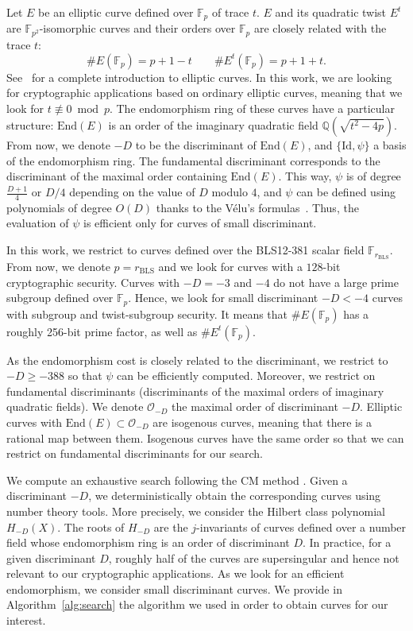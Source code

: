 \documentclass[version=preprint]{iacrcc}
\newcommand{\Q}{\ensuremath{\mathbb Q}}
\newcommand{\Fp}{\ensuremath{\mathbb F_p}}
\newcommand{\End}{\ensuremath{\text{End}}}
\begin{document}
Let $E$ be an elliptic curve defined over $\Fp$ of trace $t$. $E$ and
its quadratic twist $E^t$ are $\mathbb F_{p^2}$-isomorphic curves and
their orders over $\Fp$ are closely related with the trace
$t$:
$$\#E(\Fp) = p+1-t\qquad \#E^t(\Fp) = p+1+t.$$
See~\cite{Silverman86} for a complete introduction to elliptic curves.
In this work, we are looking for cryptographic applications based on
ordinary elliptic curves, meaning that we look for $t\not\equiv 0
\bmod p$. The endomorphism ring of these curves have a particular
structure: $\End(E)$ is an order of the imaginary quadratic field
$\Q(\sqrt{t^2-4p})$.
From now, we denote $-D$ to be the discriminant of $\End(E)$, and
$\{\text{Id},\psi\}$ a basis of the endomorphism ring.
The fundamental discriminant corresponds to the discriminant of the
maximal order containing $\End(E)$.
This way, $\psi$ is of degree $\frac{D+1}4$ or $D/4$ depending on the
value of $D$ modulo $4$, and $\psi$ can be defined using polynomials
of degree $O(D)$ thanks to the Vélu's formulas~\cite{velu71}.
Thus, the evaluation of $\psi$ is efficient only for curves of small
discriminant.

In this work, we restrict to curves defined over the BLS12-381 scalar
field $\mathbb F_{r_\text{BLS}}$. From now, we denote $p=r_\text{BLS}$
and we look for curves with a $128$-bit cryptographic security.
Curves with $-D=-3$ and $-4$ do not have a large prime subgroup
defined over $\Fp$.
Hence, we look for small discriminant $-D<-4$ curves with subgroup and
twist-subgroup security. It means that $\#E(\Fp)$ has a roughly 256-bit
prime factor, as well as $\#E^t(\Fp)$.

As the endomorphism cost is closely related to the discriminant, we
restrict to $-D \geq -388$ so that $\psi$ can be efficiently computed.
Moreover, we restrict on fundamental discriminants (discriminants
of the maximal orders of imaginary quadratic fields). We denote
$\mathcal O_{-D}$ the maximal order of discriminant $-D$. Elliptic
curves with $\End(E) \subset \mathcal O_{-D}$ are isogenous curves,
meaning that there is a rational map between them. Isogenous curves
have the same order so that we can restrict on fundamental
discriminants for our search.

We compute an exhaustive search following the CM method \cite{10.1007/3-540-58691-1_64,10.1007/3-540-46416-6_28}.
Given a discriminant $-D$, we deterministically obtain the corresponding curves using number theory tools.
More precisely, we consider the Hilbert class polynomial $H_{-D}(X)$. The roots of $H_{-D}$ are the $j$-invariants of curves defined over a number field whose endomorphism ring is an order of discriminant $D$.
In practice, for a given discriminant $D$, roughly half of the curves are supersingular and hence not relevant to our cryptographic applications.
As we look for an efficient endomorphism, we consider small discriminant curves. We provide in Algorithm~\ref{alg:search} the algorithm we used in order to obtain curves for our interest.
\end{document}
